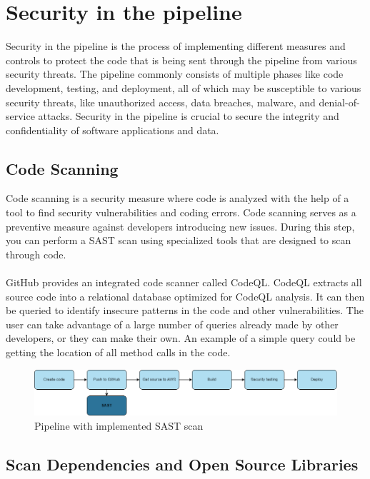 \section{Security in the pipeline}
Security in the pipeline is the process of implementing different measures and controls to protect the code that is being sent through the pipeline from various security threats. The pipeline commonly consists of multiple phases like code development, testing, and deployment, all of which may be susceptible to various security threats, like unauthorized access, data breaches, malware, and denial-of-service attacks. Security in the pipeline is crucial to secure the integrity and confidentiality of software applications and data.

\subsection{Code Scanning}
Code scanning is a security measure where code is analyzed with the help of a tool to find security vulnerabilities and coding errors. Code scanning serves as a preventive measure against developers introducing new issues. During this step, you can perform a SAST scan using specialized tools that are designed to scan through code. 
\\
\\
GitHub provides an integrated code scanner called CodeQL. CodeQL extracts all source code into a relational database optimized for CodeQL analysis.  It can then be queried to identify insecure patterns in the code and other vulnerabilities. The user can take advantage of a large number of queries already made by other developers, or they can make their own. An example of a simple query could be getting the location of all method calls in the code. 
 \cite{codeql}

 \vspace{2mm}
\begin{figure}[H]
    \centering
    \includegraphics[width=0.8\columnwidth]{Images/pipeline2.png}
    \caption{Pipeline with implemented SAST scan}
    \label{fig: Pipeline with implemented SAST scan}
\end{figure}

\subsection{Scan Dependencies and Open Source Libraries}

